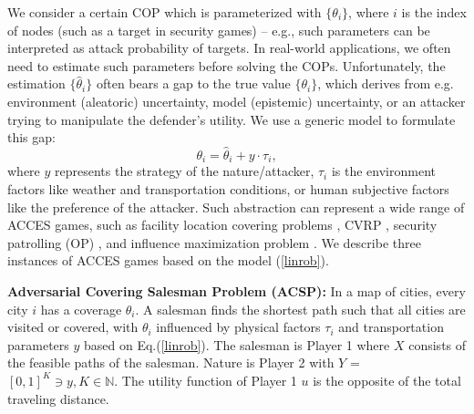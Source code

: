 
We consider a certain COP which is parameterized with $\{\theta_{i}\}$, where $i$ is the index of nodes (such as a target in security games) -- e.g., such parameters can be interpreted as attack probability of targets.
In real-world applications, we often need to estimate such parameters before solving the COPs. Unfortunately, the estimation $\{\hat{\theta}_{i}\}$ often bears a gap to the true value $\{\theta_{i}\}$, which derives from e.g. environment (aleatoric) uncertainty, model (epistemic) uncertainty, or an attacker trying to manipulate the defender's utility. We use a generic model to formulate this gap:
\begin{equation}\label{linrob}
    \theta_{i} = \hat{\theta}_{i} + y \cdot \tau_{i},
\end{equation}
where $y$ represents the strategy of the nature/attacker, $\tau_{i}$ is the environment factors like weather and transportation conditions, or human subjective factors like the preference of the attacker. 
Such abstraction can represent a wide range of ACCES games, such as facility location covering problems \cite{an2020battery, TIRKOLAEE2020340}, CVRP \cite{vehiclerouting.ch8,dinh2018exact, FLORIO20231081}, security patrolling (OP) \citep{xu2021robust}, and influence maximization problem \cite{kalimeris2019robust}. We describe three instances of ACCES games based on the model (\ref{linrob}).%


\textbf{Adversarial Covering Salesman Problem (ACSP):} In a map of cities, every city $i$ has a coverage $\theta_{i}$. A salesman finds the shortest path such that all cities are visited or covered, with $\theta_{i}$ influenced by physical factors $\tau_i$ and transportation parameters $y$ based on Eq.(\ref{linrob}). The salesman is Player 1 where $X$ consists of the feasible paths of the salesman. Nature is Player 2 with $Y$ = $[0, 1]^K \ni y, K \in \mathbb{N}$. The utility function of Player 1 $u$ is the opposite of the total traveling distance.

